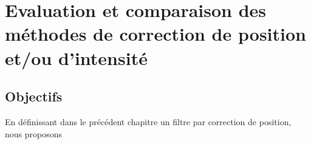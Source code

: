 
\chapter{Evaluation et comparaison des méthodes de correction de position et/ou d'intensité}

\section{Objectifs}

En définissant dans le précédent chapitre un filtre par correction de position, nous proposons